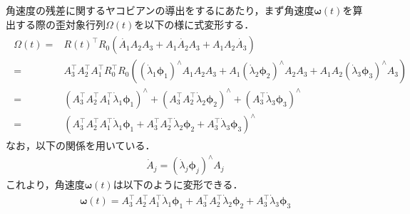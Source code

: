 角速度の残差に関するヤコビアンの導出をするにあたり，まず角速度$\boldsymbol \omega(t)$を算出する際の歪対象行列$\Omega(t)$を以下の様に式変形する．
%
\begin{align}
  \begin{split}
    \Omega(t) = & R(t)^{\top}  R_{0} \left( \dot{ A_{1} } A_{2} A_{3} + A_{1} \dot{ A_{2} } A_{3} + A_{1} A_{2} \dot{ A_{3} } \right) \\
    = & A_{3}^{\top} A_{2}^{\top} A_{1}^{\top} R_{0}^{\top} R_{0} \left( \left( \dot{ \lambda }_{1} \boldsymbol \phi_{1} \right)^{\wedge} A_{1} A_{2} A_{3} + A_{1} \left( \dot{ \lambda }_{2} \boldsymbol \phi_{2} \right)^{\wedge} A_{2} A_{3} + A_{1} A_{2} \left( \dot{ \lambda }_{3} \boldsymbol \phi_{3} \right)^{\wedge} A_{3} \right) \\
    = & \left( A_{3}^{\top} A_{2}^{\top} A_{1}^{\top} \dot{ \lambda }_{1} \boldsymbol \phi_{1} \right)^{\wedge} + \left( A_{3}^{\top} A_{2}^{\top} \dot{ \lambda }_{2} \boldsymbol \phi_{2} \right)^{\wedge} + \left( A_{3}^{\top} \dot{ \lambda }_{3} \boldsymbol \phi_{3} \right)^{\wedge} \\
    = & \left( A_{3}^{\top} A_{2}^{\top} A_{1}^{\top} \dot{ \lambda }_{1} \boldsymbol \phi_{1} + A_{3}^{\top} A_{2}^{\top} \dot{ \lambda }_{2} \boldsymbol \phi_{2} + A_{3}^{\top} \dot{ \lambda }_{3} \boldsymbol \phi_{3} \right)^{\wedge}
  \end{split}
\end{align}
%
なお，以下の関係を用いている．
%
\begin{align}
  \dot{ A }_{j} = \left( \dot{ \lambda }_{j} \boldsymbol \phi_{j} \right)^{\wedge} A_{j}
\end{align}
%
これより，角速度$\boldsymbol \omega(t)$は以下のように変形できる．
%
\begin{align}
  \boldsymbol \omega(t) = A_{3}^{\top} A_{2}^{\top} A_{1}^{\top} \dot{ \lambda }_{1} \boldsymbol \phi_{1} + A_{3}^{\top} A_{2}^{\top} \dot{ \lambda }_{2} \boldsymbol \phi_{2} + A_{3}^{\top} \dot{ \lambda }_{3} \boldsymbol \phi_{3}
  \label{eq:angular_velocity_mod}
\end{align}
%

